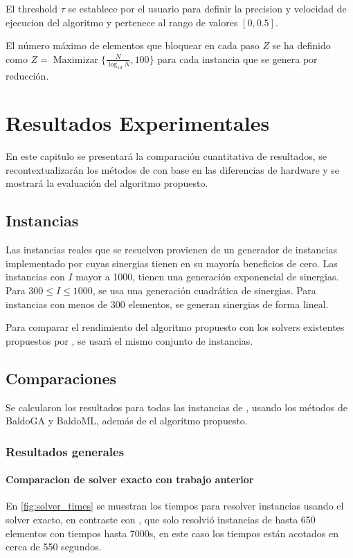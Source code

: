 \documentclass[spanish, a4paper, 12pt, openany,final]{book}
\renewcommand{\max}{\operatorname{Maximizar}}
\begin{document}
 El threshold $\tau$ se establece por el usuario para definir la precision y velocidad de ejecucion del algoritmo y pertenece al rango de valores $[0,0.5]$.
 
 El número máximo de elementos que bloquear en cada paso $Z$ se ha definido como $Z = \max\{\frac{N}{\log_{10}{N}},100\}$ para cada instancia que se genera por reducción.
 
 
\clearpage
\chapter{Resultados Experimentales}
En este capitulo se presentará la comparación cuantitativa de resultados, se recontextualizarán los métodos de \cite{baldo_polynomial_2023} con base en las diferencias de hardware y se mostrará la evaluación del algoritmo propuesto.

\section{Instancias}

Las instancias reales que se resuelven provienen de un generador de instancias implementado por \cite{baldo_polynomial_2023} cuyas sinergias tienen en su mayoría beneficios de cero. Las instancias con $I$ mayor a 1000, tienen una generación exponencial de sinergias. Para $300 \le I \le 1000$, se usa una generación cuadrática de sinergias. Para instancias con menos de 300 elementos, se generan sinergias de forma lineal.

Para comparar el rendimiento del algoritmo propuesto con los solvers existentes propuestos por \cite{baldo_polynomial_2023}, se usará el mismo conjunto de instancias.

\section{Comparaciones}

Se calcularon los resultados para todas las instancias de \cite{baldo_polynomial_2023}, usando los métodos de BaldoGA y BaldoML, además de el algoritmo propuesto.

\subsection*{Resultados generales}
\subsubsection*{Comparacion de solver exacto con trabajo anterior}
En \ref{fig:solver_times} se muestran los tiempos para resolver instancias usando el solver exacto, en contraste con \cite{baldo_polynomial_2023}, que solo resolvió instancias de hasta 650 elementos con tiempos hasta 7000s, en este caso los tiempos están acotados en cerca de 550 segundos.
\end{document}
